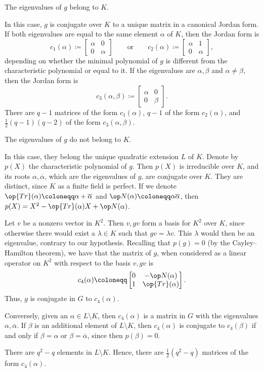 \documentclass[../main.tex]{subfiles}
\begin{document}
\begin{listalph}
	\item The eigenvalues of $g$ belong to $K$.

	In this case, $g$ is conjugate over $K$ to a unique matrix in a canonical Jordan form. If both eigenvalues are equal to the same element $\alpha$ of $K$, then the Jordan form is
	\[c_1(\alpha)\coloneqq\begin{bmatrix}
		\alpha & 0 \\
		0 & \alpha
	\end{bmatrix}\qquad\text{or}\qquad c_2(\alpha)\coloneqq\begin{bmatrix}
		\alpha & 1 \\
		0 & \alpha
	\end{bmatrix},\]
	depending on whether the minimal polynomial of $g$ is different from the characteristic polynomial or equal to it. If the eigenvalues are $\alpha,\beta$ and $\alpha\ne\beta$, then the Jordan form is
	\[c_3(\alpha,\beta)\coloneqq\begin{bmatrix}
		\alpha & 0 \\
		0 & \beta
	\end{bmatrix}.\]
	There are $q-1$ matrices of the form $c_1(\alpha)$, $q-1$ of the form $c_2(\alpha)$, and $\frac12(q-1)(q-2)$ of the form $c_3(\alpha,\beta)$.

	\item The eigenvalues of $g$ do not belong to $K$.

	In this case, they belong the unique quadratic extension $L$ of $K$. Denote by $p(X)$ the characteristic polynomial of $g$. Then $p(X)$ is irreducible over $K$, and its roots $\alpha,\overline\alpha$, which are the eigenvalues of $g$, are conjugate over $K$. They are distinct, since $K$ as a finite field is perfect. If we denote $\op{Tr}(\alpha)\coloneqq\alpha+\overline\alpha$ and $\op N(\alpha)\coloneqq\alpha\overline\alpha$, then $p(X)=X^2-\op{Tr}(\alpha)X+\op N(\alpha)$.

	Let $v$ be a nonzero vector in $K^2$. Then $v,gv$ form a basis for $K^2$ over $K$, since otherwise there would exist a $\lambda\in K$ such that $gv=\lambda v$. This $\lambda$ would then be an eigenvalue, contrary to our hypothesis. Recalling that $p(g)=0$ (by the Cayley--Hamilton theorem), we have that the matrix of $g$, when considered as a linear operator on $K^2$ with respect to the basis $v,gv$ is
	\[c_4(\alpha)\coloneqq\begin{bmatrix}
		0 & -\op N(\alpha) \\
		1 & \op{Tr}(\alpha)
	\end{bmatrix}.\]
	Thus, $g$ is conjugate in $G$ to $c_4(\alpha)$.

	Conversely, given an $\alpha\in L\setminus K$, then $c_4(\alpha)$ is a matrix in $G$ with the eigenvalues $\alpha,\overline\alpha$. If $\beta$ is an additional element of $L\setminus K$, then $c_4(\alpha)$ is conjugate to $c_4(\beta)$ if and only if $\beta=\alpha$ or $\beta=\overline\alpha$, since then $p(\beta)=0$.

	There are $q^2-q$ elements in $L\setminus K$. Hence, there are $\frac12\left(q^2-q\right)$ matrices of the form $c_4(\alpha)$.
\end{listalph}
\end{document}
